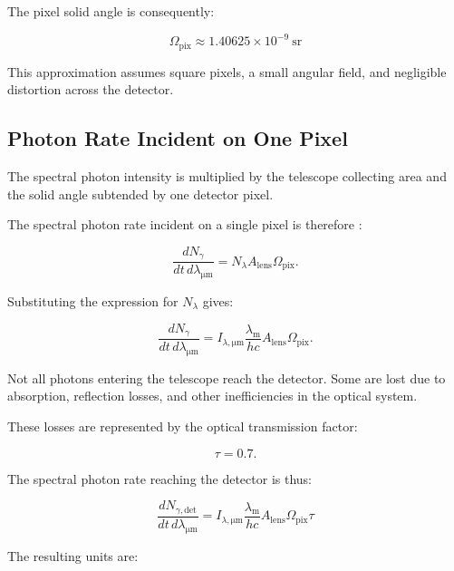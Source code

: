\documentclass{article}
\begin{document}
The pixel solid angle is consequently:

\begin{equation}
\boxed{
\Omega_{\mathrm{pix}}
\approx
1.40625\times10^{-9}\ \mathrm{sr}
}
\end{equation}

This approximation assumes square pixels, a small angular field, and negligible distortion across the detector.

\subsection{Photon Rate Incident on One Pixel}

The spectral photon intensity is multiplied by the telescope collecting area and the solid angle subtended by one detector pixel.

The spectral photon rate incident on a single pixel is therefore \cite{usgs_pp1769_chapter24}:

\begin{equation}
\frac{dN_{\gamma}}{dt\,d\lambda_{\mathrm{\mu m}}}
=
N_{\lambda}
A_{\mathrm{lens}}
\Omega_{\mathrm{pix}}.
\end{equation}

Substituting the expression for $N_{\lambda}$ gives:

\begin{equation}
\frac{dN_{\gamma}}{dt\,d\lambda_{\mathrm{\mu m}}}
=
I_{\lambda,\mathrm{\mu m}}
\frac{\lambda_{\mathrm{m}}}{hc}
A_{\mathrm{lens}}
\Omega_{\mathrm{pix}}.
\end{equation}

Not all photons entering the telescope reach the detector. Some are lost due to absorption, reflection losses, and other inefficiencies in the optical system.

These losses are represented by the optical transmission factor:

\begin{equation}
\tau=0.7.
\end{equation}

The spectral photon rate reaching the detector is thus:

\begin{equation}
\boxed{
\frac{dN_{\gamma,\mathrm{det}}}
{dt\,d\lambda_{\mathrm{\mu m}}}
=
I_{\lambda,\mathrm{\mu m}}
\frac{\lambda_{\mathrm{m}}}{hc}
A_{\mathrm{lens}}
\Omega_{\mathrm{pix}}
\tau
}
\end{equation}

The resulting units are:
\end{document}
